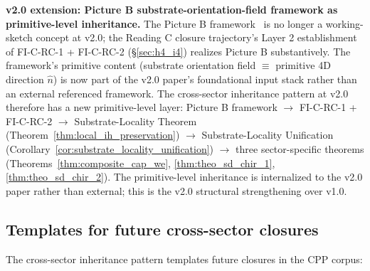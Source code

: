 \documentclass[11pt,letterpaper]{article}
\begin{document}
\textbf{v2.0 extension: Picture B substrate-orientation-field framework as primitive-level inheritance.} The Picture B framework~\cite{abshier_capotauro_closure_sketch} is no longer a working-sketch concept at v2.0; the Reading C closure trajectory's Layer 2 establishment of FI-C-RC-1 + FI-C-RC-2 (\S\ref{sec:h4_i4}) realizes Picture B substantively. The framework's primitive content (substrate orientation field $\equiv$ primitive 4D direction $\hat{n}$) is now part of the v2.0 paper's foundational input stack rather than an external referenced framework. The cross-sector inheritance pattern at v2.0 therefore has a new primitive-level layer: Picture B framework $\to$ FI-C-RC-1 + FI-C-RC-2 $\to$ Substrate-Locality Theorem (Theorem~\ref{thm:local_ih_preservation}) $\to$ Substrate-Locality Unification (Corollary~\ref{cor:substrate_locality_unification}) $\to$ three sector-specific theorems (Theorems~\ref{thm:composite_cap_we}, \ref{thm:theo_sd_chir_1}, \ref{thm:theo_sd_chir_2}). The primitive-level inheritance is internalized to the v2.0 paper rather than external; this is the v2.0 structural strengthening over v1.0.

\subsection{Templates for future cross-sector closures}\label{sec:templates_future}

The cross-sector inheritance pattern templates future closures in the CPP corpus:
\end{document}
